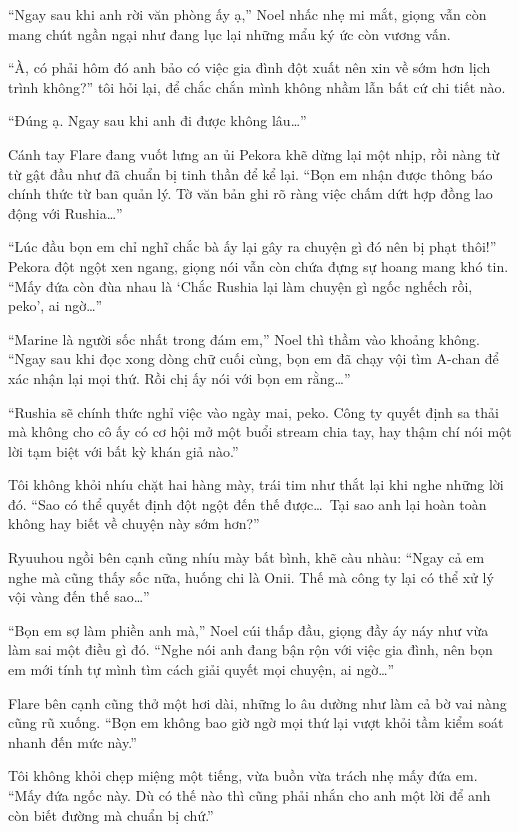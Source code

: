 \documentclass[../main.tex]{subfiles}
\begin{document}
``Ngay sau khi anh rời văn phòng ấy ạ,'' Noel nhấc nhẹ mi mắt, giọng vẫn còn mang chút ngần ngại như đang lục lại những mẩu ký ức còn vương vấn.

``À, có phải hôm đó anh bảo có việc gia đình đột xuất nên xin về sớm hơn lịch trình không?'' tôi hỏi lại, để chắc chắn mình không nhầm lẫn bất cứ chi tiết nào.

``Đúng ạ. Ngay sau khi anh đi được không lâu\dots''

Cánh tay Flare đang vuốt lưng an ủi Pekora khẽ dừng lại một nhịp, rồi nàng từ từ gật đầu như đã chuẩn bị tinh thần để kể lại. ``Bọn em nhận được thông báo chính thức từ ban quản lý. Tờ văn bản ghi rõ ràng việc chấm dứt hợp đồng lao động với Rushia\dots''

``Lúc đầu bọn em chỉ nghĩ chắc bà ấy lại gây ra chuyện gì đó nên bị phạt thôi!'' Pekora đột ngột xen ngang, giọng nói vẫn còn chứa đựng sự hoang mang khó tin. ``Mấy đứa còn đùa nhau là `Chắc Rushia lại làm chuyện gì ngốc nghếch rồi, peko', ai ngờ\dots''

``Marine là người sốc nhất trong đám em,'' Noel thì thầm vào khoảng không. ``Ngay sau khi đọc xong dòng chữ cuối cùng, bọn em đã chạy vội tìm A-chan để xác nhận lại mọi thứ. Rồi chị ấy nói với bọn em rằng\dots''

``Rushia sẽ chính thức nghỉ việc vào ngày mai, peko. Công ty quyết định sa thải mà không cho cô ấy có cơ hội mở một buổi stream chia tay, hay thậm chí nói một lời tạm biệt với bất kỳ khán giả nào.''

Tôi không khỏi nhíu chặt hai hàng mày, trái tim như thắt lại khi nghe những lời đó. ``Sao có thể quyết định đột ngột đến thế được\dots\ Tại sao anh lại hoàn toàn không hay biết về chuyện này sớm hơn?''

Ryuuhou ngồi bên cạnh cũng nhíu mày bất bình, khẽ càu nhàu: ``Ngay cả em nghe mà cũng thấy sốc nữa, huống chi là Onii. Thế mà công ty lại có thể xử lý vội vàng đến thế sao\dots''

``Bọn em sợ làm phiền anh mà,'' Noel cúi thấp đầu, giọng đầy áy náy như vừa làm sai một điều gì đó. ``Nghe nói anh đang bận rộn với việc gia đình, nên bọn em mới tính tự mình tìm cách giải quyết mọi chuyện, ai ngờ\dots''

Flare bên cạnh cũng thở một hơi dài, những lo âu dường như làm cả bờ vai nàng cũng rũ xuống. ``Bọn em không bao giờ ngờ mọi thứ lại vượt khỏi tầm kiểm soát nhanh đến mức này.''

Tôi không khỏi chẹp miệng một tiếng, vừa buồn vừa trách nhẹ mấy đứa em. ``Mấy đứa ngốc này. Dù có thế nào thì cũng phải nhắn cho anh một lời để anh còn biết đường mà chuẩn bị chứ.''
\end{document}
